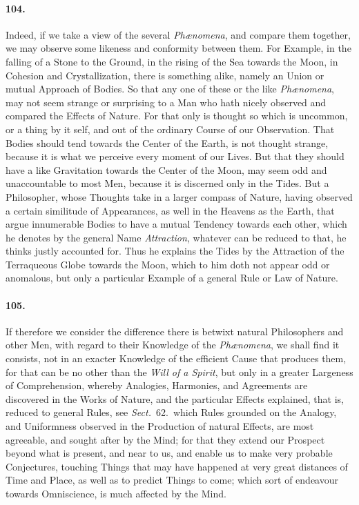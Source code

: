 \documentclass[]{article}
\newenvironment{sectionbody}{}{}
\begin{document}
\begin{sectionbody}
\paragraph{104.} Indeed, if we take a view of the several
\emph{Ph{\ae}nomena}, and compare them together, we may
observe some likeness and conformity between them.  For Example,
in the falling of a Stone to the Ground, in the rising of the Sea
towards the Moon, in Cohesion and Crystallization, there is
something alike, namely an Union or mutual Approach of Bodies.
So that any one of these or the like \emph{Ph{\ae}nomena},
may not seem strange or surprising to a Man who hath nicely
observed and compared the Effects of Nature.  For that only is
thought so which is uncommon, or a thing by it self, and out of
the ordinary Course of our Observation.  That Bodies should tend
towards the Center of the Earth, is not thought strange, because
it is what we perceive every moment of our Lives.  But that they
should have a like Gravitation towards the Center of the Moon,
may seem odd and unaccountable to most Men, because it is
discerned only in the Tides.  But a Philosopher, whose Thoughts
take in a larger compass of Nature, having observed a certain
similitude of Appearances, as well in the Heavens as the Earth,
that argue innumerable Bodies to have a mutual Tendency towards
each other, which he denotes by the general Name
\emph{Attraction}, whatever can be reduced to that, he thinks
justly accounted for.  Thus he explains the Tides by the
Attraction of the Terraqueous Globe towards the Moon, which to
him doth not appear odd or anomalous, but only a particular
Example of a general Rule or Law of Nature.



\paragraph{105.} If therefore we consider the difference there is betwixt natural
Philosophers and other Men, with regard to their Knowledge of the
\emph{Ph{\ae}nomena}, we shall find it consists, not in an
exacter Knowledge of the efficient Cause that produces them,  for
that can be no other than the \emph{Will of a Spirit},  but
only in a greater Largeness of Comprehension, whereby Analogies,
Harmonies, and Agreements are discovered in the Works of Nature,
and the particular Effects explained, that is, reduced to general
Rules, see \emph{Sect.}~62.\ which Rules
grounded on the Analogy, and Uniformness observed in the
Production of natural Effects, are most agreeable, and sought
after by the Mind; for that they extend our Prospect beyond what
is present, and near to us, and enable us to make very probable
Conjectures, touching Things that may have happened at very great
distances of Time and Place, as well as to predict Things to
come; which sort of endeavour towards Omniscience, is much
affected by the Mind.




\end{sectionbody}
\end{document}
